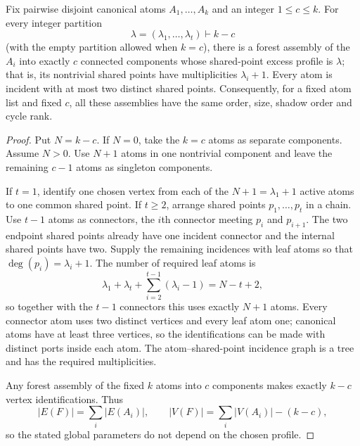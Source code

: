 \begin{lemma}
\label{lemma-capacity-safe-profile-realization}
Fix pairwise disjoint canonical atoms $A_1,\ldots,A_k$ and an integer
$1\le c\le k$.  For every integer partition
\[
 \lambda=(\lambda_1,\ldots,\lambda_t)\vdash k-c
\]
(with the empty partition allowed when $k=c$), there is a forest assembly of
the $A_i$ into exactly $c$ connected components whose shared-point excess
profile is $\lambda$; that is, its nontrivial shared points have
multiplicities $\lambda_i+1$.  Every atom is incident with at most two
distinct shared points.  Consequently, for a fixed atom list and fixed $c$,
all these assemblies have the same order, size, shadow order and cycle rank.
\end{lemma}
\begin{proof}
Put $N=k-c$.  If $N=0$, take the $k=c$ atoms as separate components.  Assume
$N>0$.  Use $N+1$ atoms in one nontrivial component and leave the remaining
$c-1$ atoms as singleton components.

If $t=1$, identify one chosen vertex from each of the $N+1=\lambda_1+1$
active atoms to one common shared point.  If $t\ge2$, arrange shared points
$p_1,\ldots,p_t$ in a chain.  Use $t-1$ atoms as connectors, the $i$th
connector meeting $p_i$ and $p_{i+1}$.  The two endpoint shared points already
have one incident connector and the internal shared points have two.  Supply
the remaining incidences with leaf atoms so that
$\deg(p_i)=\lambda_i+1$.  The number of required leaf atoms is
\[
 \lambda_1+\lambda_t+\sum_{i=2}^{t-1}(\lambda_i-1)
   =N-t+2,
\]
so together with the $t-1$ connectors this uses exactly $N+1$ atoms.  Every
connector atom uses two distinct vertices and every leaf atom one; canonical
atoms have at least three vertices, so the identifications can be made with
distinct ports inside each atom.  The atom--shared-point incidence graph is a
tree and has the required multiplicities.

Any forest assembly of the fixed $k$ atoms into $c$ components makes exactly
$k-c$ vertex identifications.  Thus
\[
 |E(F)|=\sum_i|E(A_i)|,
 \qquad
 |V(F)|=\sum_i|V(A_i)|-(k-c),
\]
so the stated global parameters do not depend on the chosen profile.
\end{proof}


